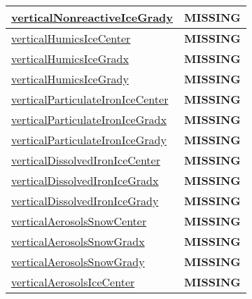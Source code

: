 {\begin{center}
\begin{longtable}{| p{2.0in} | p{4.0in} |}
    \hline
    \hyperref[subsec:var_sec_tracer_reconstruction_verticalNonreactiveIceGrady]{verticalNonreactiveIceGrady} & {\bf \color{red} MISSING} \\
    \hline
    \hyperref[subsec:var_sec_tracer_reconstruction_verticalHumicsIceCenter]{verticalHumicsIceCenter} & {\bf \color{red} MISSING} \\
    \hline
    \hyperref[subsec:var_sec_tracer_reconstruction_verticalHumicsIceGradx]{verticalHumicsIceGradx} & {\bf \color{red} MISSING} \\
    \hline
    \hyperref[subsec:var_sec_tracer_reconstruction_verticalHumicsIceGrady]{verticalHumicsIceGrady} & {\bf \color{red} MISSING} \\
    \hline
    \hyperref[subsec:var_sec_tracer_reconstruction_verticalParticulateIronIceCenter]{verticalParticulateIronIceCenter} & {\bf \color{red} MISSING} \\
    \hline
    \hyperref[subsec:var_sec_tracer_reconstruction_verticalParticulateIronIceGradx]{verticalParticulateIronIceGradx} & {\bf \color{red} MISSING} \\
    \hline
    \hyperref[subsec:var_sec_tracer_reconstruction_verticalParticulateIronIceGrady]{verticalParticulateIronIceGrady} & {\bf \color{red} MISSING} \\
    \hline
    \hyperref[subsec:var_sec_tracer_reconstruction_verticalDissolvedIronIceCenter]{verticalDissolvedIronIceCenter} & {\bf \color{red} MISSING} \\
    \hline
    \hyperref[subsec:var_sec_tracer_reconstruction_verticalDissolvedIronIceGradx]{verticalDissolvedIronIceGradx} & {\bf \color{red} MISSING} \\
    \hline
    \hyperref[subsec:var_sec_tracer_reconstruction_verticalDissolvedIronIceGrady]{verticalDissolvedIronIceGrady} & {\bf \color{red} MISSING} \\
    \hline
    \hyperref[subsec:var_sec_tracer_reconstruction_verticalAerosolsSnowCenter]{verticalAerosolsSnowCenter} & {\bf \color{red} MISSING} \\
    \hline
    \hyperref[subsec:var_sec_tracer_reconstruction_verticalAerosolsSnowGradx]{verticalAerosolsSnowGradx} & {\bf \color{red} MISSING} \\
    \hline
    \hyperref[subsec:var_sec_tracer_reconstruction_verticalAerosolsSnowGrady]{verticalAerosolsSnowGrady} & {\bf \color{red} MISSING} \\
    \hline
    \hyperref[subsec:var_sec_tracer_reconstruction_verticalAerosolsIceCenter]{verticalAerosolsIceCenter} & {\bf \color{red} MISSING} \\

\end{longtable}
\end{center}}
